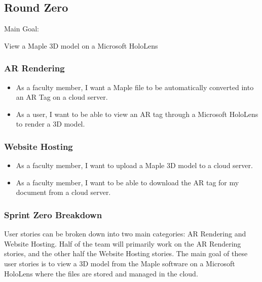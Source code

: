 


\subsection{Round Zero}

Main Goal:

View a Maple 3D model on a Microsoft HoloLens

\subsubsection{AR Rendering}

\begin{itemize}
	\item As a faculty member, I want a Maple file to be automatically converted into an AR Tag on a cloud server.
	\item As a user, I want to be able to view an AR tag through a Microsoft HoloLens to render a 3D model.
\end{itemize}

\subsubsection{Website Hosting}

\begin{itemize}
	\item As a faculty member, I want to upload a Maple 3D model to a cloud server.
	\item As a faculty member, I want to be able to download the AR tag for my document from a cloud server.
\end{itemize}

\subsubsection{Sprint Zero Breakdown}
User stories can be broken down into two main categories: AR Rendering and Website Hosting.  Half of the team will primarily work on 
the AR Rendering stories, and the other half the Website Hosting stories.  The main goal of these user stories is to view a
3D model from the Maple software on a Microsoft HoloLens where the files are stored and managed in the cloud.

